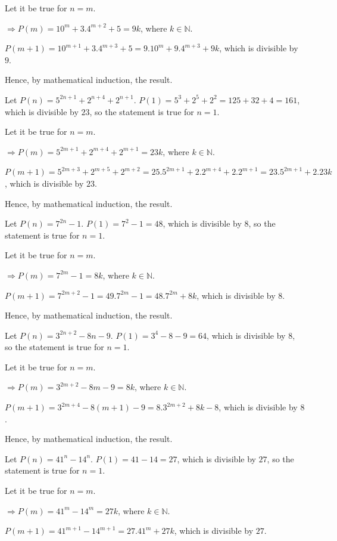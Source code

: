   Let it be true for $n = m$.

  $\Rightarrow P(m) = 10^m + 3.4^{m + 2} + 5 = 9k$, where $k\in\mathbb{N}$.

  $P(m + 1) = 10^{m + 1} + 3.4^{m + 3} + 5 = 9.10^m + 9.4^{m + 3} + 9k$, which is divisible by $9$.

  Hence, by mathematical induction, the result.
\item Let $P(n) = 5^{2n + 1} + 2^{n + 4} + 2^{n + 1}$. $P(1) = 5^3 + 2^5 + 2^2 = 125 + 32 + 4 = 161$, which
  is divisible by $23$, so the statement is true for $n = 1$.

  Let it be true for $n = m$.

  $\Rightarrow P(m) = 5^{2m + 1} + 2^{m + 4} + 2^{m + 1} = 23k$, where $k\in\mathbb{N}$.

  $P(m + 1) = 5^{2m + 3} + 2^{m + 5} + 2^{m + 2} = 25.5^{2m + 1} + 2.2^{m + 4} + 2.2^{m + 1} = 23.5^{2m + 1}
  + 2.23k$, which is divisible by $23$.

  Hence, by mathematical induction, the result.
\item Let $P(n) = 7^{2n} - 1$. $P(1) = 7^2 - 1 = 48$, which is divisible by $8$, so the statement is true
  for $n = 1$.

  Let it be true for $n = m$.

  $\Rightarrow P(m) = 7^{2m} - 1 = 8k$, where $k\in\mathbb{N}$.

  $P(m + 1) = 7^{2m + 2} - 1 = 49.7^{2m} - 1 = 48.7^{2m} + 8k$, which is divisible by $8$.

  Hence, by mathematical induction, the result.
\item Let $P(n) = 3^{2n + 2} - 8n - 9$. $P(1) = 3^4 - 8 - 9 = 64$, which is divisible by $8$, so the
  statement is true for $n = 1$.

  Let it be true for $n = m$.

  $\Rightarrow P(m) = 3^{2m + 2} - 8m - 9 = 8k$, where $k\in\mathbb{N}$.

  $P(m + 1) = 3^{2m + 4} - 8(m + 1) - 9 = 8.3^{2m + 2} + 8k - 8$, which is divisible by $8$.

  Hence, by mathematical induction, the result.
\item Let $P(n) = 41^n - 14^n$. $P(1) = 41 - 14 = 27$, which is divisible by $27$, so the statement is true
  for $n = 1$.

  Let it be true for $n = m$.

  $\Rightarrow P(m) = 41^m - 14^m = 27k$, where $k\in\mathbb{N}$.

  $P(m + 1) = 41^{m + 1} - 14^{m + 1} = 27.41^m + 27k$, which is divisible by $27$.

